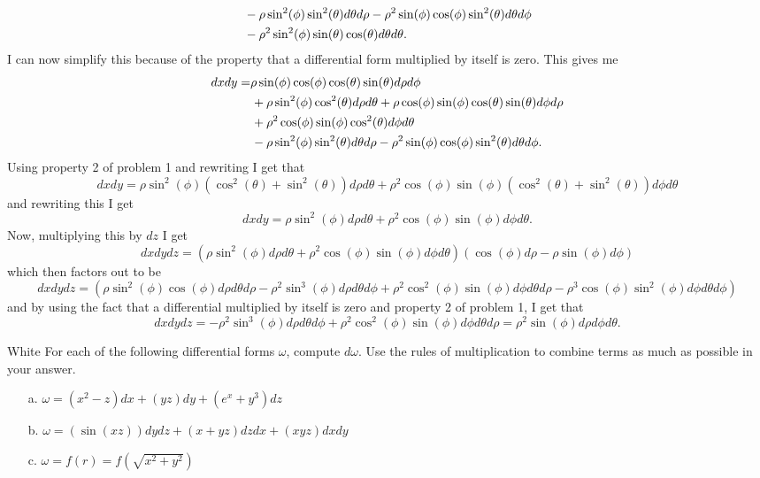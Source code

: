 \documentclass[titlepage]{article}
\begin{document}
\begin{solution}
\begin{itemize}
\begin{align*}
&\, \hspace{-.1em}- \rho\sin^2(\phi)\sin^2(\theta)d\theta d\rho - \rho^2\sin(\phi)\cos(\phi)\sin^2(\theta) d\theta d\phi \\
&\, \hspace{-.1em}- \rho^2\sin^2(\phi)\sin(\theta)\cos(\theta) d\theta d\theta.
\end{align*}
I can now simplify this because of the property that a differential form multiplied by itself is zero. This gives me
\begin{align*}
dxdy =& \rho\sin(\phi)\cos(\phi)\cos(\theta)\sin(\theta) d\rho d\phi \\
&\,\hspace{-.1em}+ \rho\sin^2(\phi)\cos^2(\theta) d\rho d\theta + \rho \cos(\phi)\sin(\phi)\cos(\theta)\sin(\theta)d\phi d\rho \\
&\, \hspace{-.1em}+ \rho^2 \cos(\phi)\sin(\phi)\cos^2(\theta) d\phi d\theta \\
&\, \hspace{-.1em}- \rho\sin^2(\phi)\sin^2(\theta)d\theta d\rho - \rho^2\sin(\phi)\cos(\phi)\sin^2(\theta) d\theta d\phi.
\end{align*}
Using property 2 of problem 1 and rewriting I get that 
$$dxdy = \rho\sin^2(\phi)(\cos^2(\theta) + \sin^2(\theta))d\rho d\theta + \rho^2\cos(\phi)\sin(\phi)(\cos^2(\theta) + \sin^2(\theta))d\phi d\theta$$
and rewriting this I get
$$dxdy = \rho\sin^2(\phi)d\rho d\theta + \rho^2 \cos(\phi)\sin(\phi)d\phi d\theta.$$
Now, multiplying this by $dz$ I get
$$dxdydz = (\rho\sin^2(\phi)d\rho d\theta + \rho^2 \cos(\phi)\sin(\phi)d\phi d\theta)(\cos(\phi) d\rho - \rho \sin(\phi) d\phi)$$
which then factors out to be
$$ dxdydz = (\rho\sin^2(\phi)\cos(\phi)d\rho d\theta d\rho - \rho^2 \sin^3(\phi) d\rho d\theta d\phi + \rho^2 \cos^2(\phi)\sin(\phi) d\phi d\theta d\rho - \rho^3 \cos(\phi) \sin^2(\phi) d\phi d\theta d\phi) $$
and by using the fact that a differential multiplied by itself is zero and property 2 of problem 1, I get that
$$dxdydz= - \rho^2 \sin^3(\phi) d\rho d\theta d\phi + \rho^2 \cos^2(\phi)\sin(\phi) d\phi d\theta d\rho = \rho^2 \sin(\phi)d\rho d\phi d\theta.$$
\end{itemize}
\end{solution}
\begin{cproblem}{3}{White} For each of the following differential forms $\omega$, compute $d\omega$. Use the rules of multiplication to combine terms as much as possible in your answer.
\begin{itemize}
\item[a.] $\omega = (x^2 - z)dx + (yz)dy + (e^x + y^3)dz$
\item[b.] $\omega = (\sin(xz))dydz + (x+yz)dzdx + (xyz)dxdy$
\item[c.] $\omega = f(r) = f\left(\sqrt{x^2 + y^2}\right)$
\end{itemize}
\end{cproblem}
\end{document}
